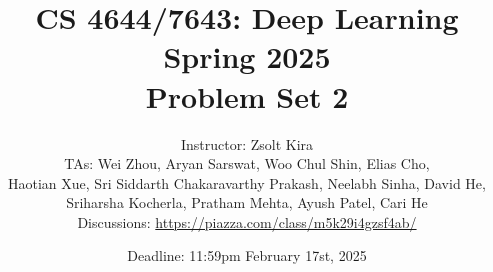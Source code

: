 \documentclass[11pt,english]{article}
\begin{document}
\title{CS 4644/7643: Deep Learning\\
Spring 2025 \\
Problem Set 2} 

\author{Instructor: Zsolt Kira \\
TAs: Wei Zhou, Aryan Sarswat, Woo Chul Shin, Elias Cho, \\Haotian Xue, Sri Siddarth Chakaravarthy Prakash, Neelabh Sinha, David He, \\ Sriharsha Kocherla, Pratham Mehta, Ayush Patel, Cari He\\
Discussions: \url{https://piazza.com/class/m5k29i4gzsf4ab/}}
\date{Deadline: 11:59pm February 17st, 2025}
\maketitle
\end{document}
